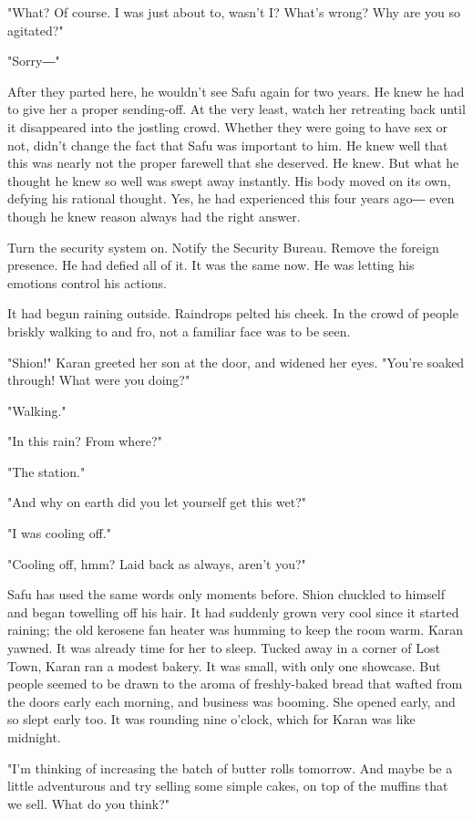 "What? Of course. I was just about to, wasn't I? What's wrong? Why are
you so agitated?"

"Sorry―"

After they parted here, he wouldn't see Safu again for two years. He
knew he had to give her a proper sending-off. At the very least, watch
her retreating back until it disappeared into the jostling crowd.
Whether they were going to have sex or not, didn't change the fact that
Safu was important to him. He knew well that this was nearly not the
proper farewell that she deserved. He knew. But what he thought he knew
so well was swept away instantly. His body moved on its own, defying his
rational thought. Yes, he had experienced this four years ago― even
though he knew reason always had the right answer.

Turn the security system on. Notify the Security Bureau. Remove the
foreign presence. He had defied all of it. It was the same now. He was
letting his emotions control his actions.

It had begun raining outside. Raindrops pelted his cheek. In the crowd
of people briskly walking to and fro, not a familiar face was to be
seen.

"Shion!" Karan greeted her son at the door, and widened her eyes.
"You're soaked through! What were you doing?"

"Walking."

"In this rain? From where?"

"The station."

"And why on earth did you let yourself get this wet?"

"I was cooling off."

"Cooling off, hmm? Laid back as always, aren't you?"

Safu has used the same words only moments before. Shion chuckled to
himself and began towelling off his hair. It had suddenly grown very
cool since it started raining; the old kerosene fan heater was humming
to keep the room warm. Karan yawned. It was already time for her to
sleep. Tucked away in a corner of Lost Town, Karan ran a modest bakery.
It was small, with only one showcase. But people seemed to be drawn to
the aroma of freshly-baked bread that wafted from the doors early each
morning, and business was booming. She opened early, and so slept early
too. It was rounding nine o'clock, which for Karan was like midnight.

"I'm thinking of increasing the batch of butter rolls tomorrow. And
maybe be a little adventurous and try selling some simple cakes, on top
of the muffins that we sell. What do you think?"

